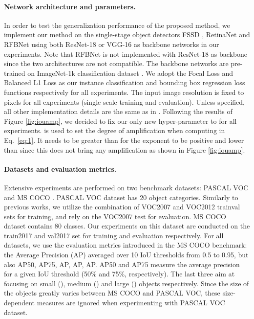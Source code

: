 \documentclass[runningheads]{llncs}
\begin{document}
\paragraph{Network architecture and parameters.}
In order to test the generalization performance of the proposed method, we implement our method on the single-stage object detectors FSSD \cite{FSSD}, RetinaNet \cite{RetinaNet} and RFBNet \cite{RFBNet} using both ResNet-18 \cite{ResNet} or VGG-16 \cite{VGG} as backbone networks in our experiments. Note that RFBNet is not implemented with ResNet-18 as backbone since the two architectures are not compatible.
The backbone networks are pre-trained on ImageNet-1k classification dataset \cite{ImageNet}. 
We adopt the Focal Loss \cite{RetinaNet} and Balanced L1 Loss \cite{LibraRCNN} as our instance classification and bounding box regression loss functions respectively for all experiments.
The input image resolution is fixed to  pixels for all experiments (single scale training and evaluation).
Unless specified, all other implementation details are the same as in \cite{RFBNet}.
Following the results of Figure \ref{fig:iouamp}, we decided to fix our only new hyper-parameter  to  for all experiments.  is used to set the degree of amplification when computing  in Eq.~\eqref{eq:1}. It needs to be greater than  for the exponent to be positive and lower than  since this does not bring any amplification as shown in Figure \ref{fig:iouamp}. 

\paragraph{Datasets and evaluation metrics.}
Extensive experiments are performed on two benchmark datasets: PASCAL VOC \cite{VOC} and MS COCO \cite{COCO}. PASCAL VOC dataset has 20 object categories. Similarly to previous works, we utilize the combination of VOC2007 and VOC2012 trainval sets for training, and rely on the VOC2007 test for evaluation. MS COCO dataset contains 80 classes. Our experiments on this dataset are conducted on the train2017 and val2017 set for training and evaluation respectively.
For all datasets, we use the evaluation metrics introduced in the MS COCO benchmark: the Average Precision (AP) averaged over 10 IoU thresholds from 0.5 to 0.95, but also AP50, AP75, AP, AP, AP. AP50 and AP75 measure the average precision for a given IoU threshold (50\% and 75\%, respectively). The last three aim at focusing on small (), medium () and large () objects respectively. Since the size of the objects greatly varies between MS COCO and PASCAL VOC, these size-dependent measures are ignored when experimenting with PASCAL VOC dataset.
\end{document}
